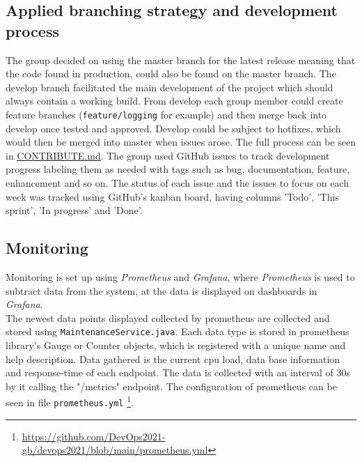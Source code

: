 \subsection{Applied branching strategy and development process} %
The group decided on using the master branch for the latest release meaning that the code found in production, could also be found on the master branch. The develop branch facilitated the main development of the project which should always contain a working build. From develop each group member could create feature branches (\texttt{feature/logging} for example) and then merge back into develop once tested and approved. Develop could be subject to hotfixes, which would then be merged into master when issues arose. The full process can be seen in \underline{\href{https://github.com/DevOps2021-gb/devops2021/blob/main/CONTRIBUTE.md}{CONTRIBUTE.md}}. The group used GitHub issues to track development progress labeling them as needed with tags such as bug, documentation, feature, enhancement and so on. The status of each issue and the issues to focus on each week was tracked using GitHub's kanban board, having columns 'Todo', 'This sprint', 'In progress' and 'Done'.

\subsection{Monitoring} %
Monitoring is set up using \textit{Prometheus} and \textit{Grafana}, where \textit{Prometheus} is used to subtract data from the system, at the data is displayed on dashboards in \textit{Grafana}.\\
The newest data points displayed collected by prometheus are collected and stored using \texttt{MaintenanceService.java}. Each data type is stored in prometheus library's Gauge or Counter objects, which is registered with a unique name and help description. Data gathered is the current cpu load, data base information and response-time of each endpoint. The data is collected with an interval of 30s by it calling the "/metrics" endpoint. The configuration of prometheus can be seen in file \texttt{prometheus.yml} \footnote{\url{https://github.com/DevOps2021-gb/devops2021/blob/main/prometheus.yml}}.

